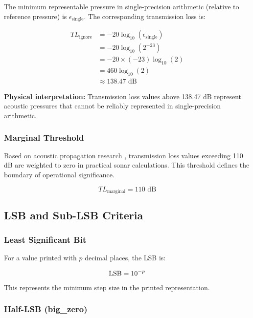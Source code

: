The minimum representable pressure in single-precision arithmetic (relative to reference pressure) is $\epsilon_{\text{single}}$. The corresponding transmission loss is:

\begin{align}
    TL_{\text{ignore}} &= -20 \log_{10}(\epsilon_{\text{single}}) \\
    &= -20 \log_{10}(2^{-23}) \\
    &= -20 \times (-23) \log_{10}(2) \\
    &= 460 \log_{10}(2) \\
    &\approx 138.47 \text{ dB}
\end{align}

\textbf{Physical interpretation:} Transmission loss values above 138.47 dB represent acoustic pressures that cannot be reliably represented in single-precision arithmetic.

\subsubsection{Marginal Threshold}

Based on acoustic propagation research \cite{doi:10.23919/OCEANS.2009.5422312}, transmission loss values exceeding 110 dB are weighted to zero in practical sonar calculations. This threshold defines the boundary of operational significance.

\begin{equation}
    TL_{\text{marginal}} = 110 \text{ dB}
\end{equation}

\subsection{LSB and Sub-LSB Criteria}

\subsubsection{Least Significant Bit}

For a value printed with $p$ decimal places, the LSB is:

\begin{equation}
    \mathrm{LSB} = 10^{-p}
\end{equation}

This represents the minimum step size in the printed representation.

\subsubsection{Half-LSB (big\_zero)}

